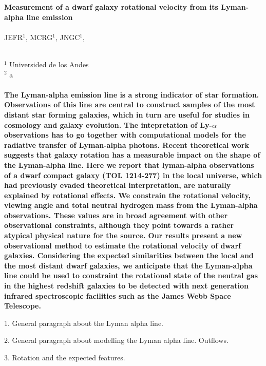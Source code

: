 \documentclass[a4paper, 12pt]{article}
\begin{document}
\pagestyle{empty}
\noindent
\textbf{Measurement of a dwarf galaxy rotational velocity from its Lyman-alpha
  line emission}
\\
\\
JEFR$^{1}$, MCRG$^1$, JNGC$^1$,
\\
\\
\scriptsize
{$^1$ Universided de los Andes
\\
$^2$ a
\normalsize
\\
\\
\textbf{The Lyman-alpha emission line is a strong indicator of star formation.
Observations of this line are central to construct samples of the most
distant star forming galaxies, which in turn are useful for studies in
cosmology and galaxy evolution.  
The intepretation of Ly-$\alpha$ observations has to go together with
computational models for the radiative transfer of Lyman-alpha photons.
Recent theoretical work suggests that galaxy rotation has a
measurable impact on the shape of the Lyman-alpha line. 
Here we report that lyman-alpha observations of a dwarf compact galaxy (TOL
1214-277) in the local universe, which had previously evaded theoretical 
interpretation, are naturally explained by rotational effects.
We constrain the rotational velocity, viewing angle and total
neutral hydrogen mass from the Lyman-alpha observations.
These values are in broad agreement with other observational
constraints, although  they point towards a rather atypical physical
nature for the source.  
Our results present a new observational method to estimate the rotational
velocity of dwarf galaxies.
Considering the expected similarities between the local and the most
distant dwarf galaxies, we anticipate that the Lyman-alpha line could be
used to constraint the rotational state of the neutral gas in the
highest redshift galaxies to be detected with next generation infrared
spectroscopic facilities such as the James Webb Space Telescope.}




1. General paragraph about the Lyman alpha line.

2. General paragraph about modelling the Lyman alpha
line. Outflows.

3. Rotation and the expected features.


}
\end{document}
